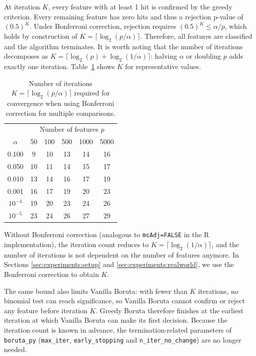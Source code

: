 \documentclass[runningheads]{llncs}
\begin{document}
At iteration $K$, every feature with at least 1 hit is confirmed by the greedy criterion. Every remaining feature has zero hits and thus a rejection p-value of $(0.5)^K$. Under Bonferroni correction, rejection requires $(0.5)^K \leq \alpha/p$, which holds by construction of $K = \lceil \log_2(p/\alpha) \rceil$. Therefore, all features are classified and the algorithm terminates. It is worth noting that the number of iterations decomposes as $K = \lceil \log_2(p) + \log_2(1/\alpha) \rceil$: halving $\alpha$ or doubling $p$ adds exactly one iteration. Table~\ref{tab:iterations_alpha} shows $K$ for representative values.

\begin{table}[H]
\centering
\caption{Number of iterations $K = \lceil \log_2(p/\alpha) \rceil$ required for convergence when using Bonferroni correction for multiple comparisons.}
\label{tab:iterations_alpha}
\begin{tabular}{c|ccccc}
\toprule
& \multicolumn{5}{c}{Number of features $p$} \\
$\alpha$ & 50 & 100 & 500 & 1000 & 5000 \\
\midrule
0.100 & 9 & 10 & 13 & 14 & 16 \\
0.050 & 10 & 11 & 14 & 15 & 17 \\
0.010 & 13 & 14 & 16 & 17 & 19 \\
0.001 & 16 & 17 & 19 & 20 & 23 \\
$10^{-4}$ & 19 & 20 & 23 & 24 & 26 \\
$10^{-5}$ & 23 & 24 & 26 & 27 & 29 \\
\bottomrule
\end{tabular}
\end{table}

\noindent Without Bonferroni correction (analogous to \texttt{mcAdj=FALSE} in the R implementation), the iteration count reduces to $K = \lceil \log_2(1/\alpha) \rceil$, and the number of iterations is not dependent on the number of features anymore. In Sections \ref{sec:experiments:setup} and \ref{sec:experiments:realworld}, we use the Bonferroni correction to obtain $K$.

The same bound also limits Vanilla Boruta: with fewer than $K$ iterations, no binomial test can reach significance, so Vanilla Boruta cannot confirm or reject any feature before iteration $K$. Greedy Boruta therefore finishes at the earliest iteration at which Vanilla Boruta can make its first decision. Because the iteration count is known in advance, the termination-related parameters of \texttt{boruta\_py} (\texttt{max\_iter}, \texttt{early\_stopping} and \texttt{n\_iter\_no\_change}) are no longer needed.
\end{document}
